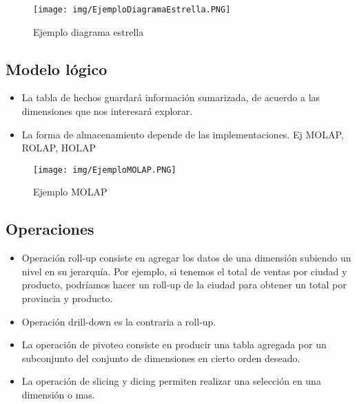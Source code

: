 \begin{figure}[!htb]
    \centering
    \texttt{[image: img/EjemploDiagramaEstrella.PNG]}
    \caption{Ejemplo diagrama estrella}
\end{figure}

\subsection*{Modelo lógico}
\begin{itemize}
\item La tabla de hechos guardará información sumarizada, de acuerdo a las dimensiones que nos interesará explorar.
\item La forma de almacenamiento depende de las implementaciones. Ej MOLAP, ROLAP, HOLAP
\end{itemize}

\begin{figure}[!htb]
    \centering
    \texttt{[image: img/EjemploMOLAP.PNG]}
    \caption{Ejemplo MOLAP}
\end{figure}


\subsection*{Operaciones}
\begin{itemize}
\item Operación roll-up consiste en agregar los datos de una dimensión subiendo un nivel en su jerarquía.  Por ejemplo, si tenemos el total de ventas por ciudad y producto, podríamos hacer un roll-up de la ciudad para obtener un total por provincia y producto.
\item Operación drill-down es la contraria a roll-up.
\item La operación de pivoteo consiste en producir una tabla agregada por un subconjunto del conjunto de dimensiones en cierto orden deseado.
\item La operación de slicing y dicing permiten realizar una selección en una dimensión o mas.
\end{itemize}



\newpage